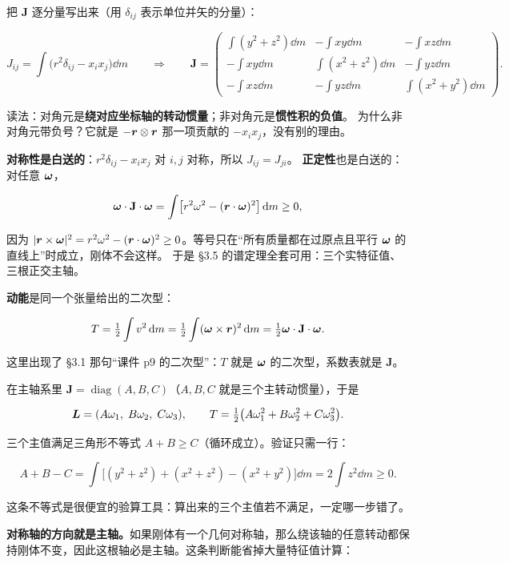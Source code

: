 \documentclass[11pt]{ctexart}
\newcommand{\ten}[1]{\mathbf{#1}}
\let\origsubhdr\subhdr
\renewcommand{\subhdr}[1]{\par\needspace{3\baselineskip}\origsubhdr{#1}}
\begin{document}

把 $\ten J$ 逐分量写出来（用 $\delta_{ij}$ 表示单位并矢的分量）：

\[
J_{ij}=\int\bigl(r^2\delta_{ij}-x_ix_j\bigr)\dd m
\qquad\Longrightarrow\qquad
\ten J=
\begin{pmatrix}
\int(y^2+z^2)\dd m & -\int xy\dd m & -\int xz\dd m\\[3pt]
-\int xy\dd m & \int(x^2+z^2)\dd m & -\int yz\dd m\\[3pt]
-\int xz\dd m & -\int yz\dd m & \int(x^2+y^2)\dd m
\end{pmatrix}.
\]

读法：对角元是\textbf{绕对应坐标轴的转动惯量}；非对角元是\textbf{惯性积的负值}。
为什么非对角元带负号？它就是 $-\boldsymbol{r}\otimes\boldsymbol{r}$ 那一项贡献的 $-x_ix_j$，没有别的理由。

\textbf{对称性是白送的}：$r^2\delta_{ij}-x_ix_j$ 对 $i,j$ 对称，所以 $J_{ij}=J_{ji}$。
\textbf{正定性}也是白送的：对任意 $\boldsymbol{\omega}$，

\[
\vect\omega\cdot\ten J\cdot\vect\omega=\int\bigl[r^2\omega^2-(\vect r\cdot\vect\omega)^2\bigr]\dd m\ge0,
\]

因为 $|\boldsymbol{r}\times\boldsymbol{\omega}|^2=r^2\omega^2-(\boldsymbol{r}\cdot\boldsymbol{\omega})^2\ge0$。等号只在“所有质量都在过原点且平行 $\boldsymbol{\omega}$ 的直线上”时成立，刚体不会这样。
于是 §3.5 的谱定理全套可用：三个实特征值、三根正交主轴。

\textbf{动能}是同一个张量给出的二次型：

\[
T=\tfrac12\int v^2\dd m=\tfrac12\int(\vect\omega\times\vect r)^2\dd m=\tfrac12\vect\omega\cdot\ten J\cdot\vect\omega .
\]

这里出现了 §3.1 那句“课件 p9 的二次型”：$T$ 就是 $\boldsymbol{\omega}$ 的二次型，系数表就是 $\ten J$。


在主轴系里 $\ten J=\operatorname{diag}(A,B,C)$（$A,B,C$ 就是三个主转动惯量），于是

\[
\boldsymbol{L}=(A\omega_1,\;B\omega_2,\;C\omega_3),
\qquad
T=\tfrac12\bigl(A\omega_1^2+B\omega_2^2+C\omega_3^2\bigr).
\]

三个主值满足三角形不等式 $A+B\ge C$（循环成立）。验证只需一行：

\[
A+B-C=\int\bigl[(y^2+z^2)+(x^2+z^2)-(x^2+y^2)\bigr]\dd m=2\int z^2\dd m\ge0 .
\]

这条不等式是很便宜的验算工具：算出来的三个主值若不满足，一定哪一步错了。

\textbf{对称轴的方向就是主轴。}如果刚体有一个几何对称轴，那么绕该轴的任意转动都保持刚体不变，因此这根轴必是主轴。这条判断能省掉大量特征值计算：
\end{document}
